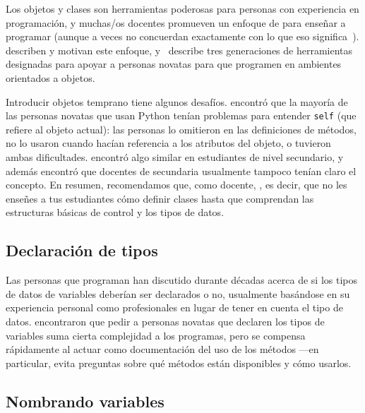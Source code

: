 Los objetos y clases son herramientas poderosas para personas con experiencia en programación,
y muchas/os docentes promueven un enfoque de  para enseñar a programar
(aunque a veces no concuerdan exactamente con lo que eso significa~\cite{Benn2007b}).
\cite{Sorv2014} describen y motivan este enfoque,
y~\cite{Koll2015} describe tres generaciones de herramientas
designadas para apoyar a personas novatas para que programen en ambientes orientados a objetos.

Introducir objetos temprano tiene algunos desafíos.
\cite{Mill2016b} encontró que la mayoría de las personas novatas que usan Python
tenían problemas para entender \texttt{self}
(que refiere al objeto actual):
las personas lo omitieron en las definiciones de métodos,
no lo usaron cuando hacían referencia a los atributos del objeto,
o tuvieron ambas dificultades.
\cite{Rago2017} encontró algo similar en estudiantes de nivel secundario,
y además encontró que docentes de secundaria usualmente tampoco tenían claro el concepto.
En resumen,
recomendamos que, como docente, ,
es decir, que no les enseñes a tus estudiantes cómo definir clases
hasta que comprendan las estructuras básicas de control y los tipos de datos.

\subsection*{Declaración de tipos}

Las personas que programan han discutido durante décadas acerca de si los tipos de datos de variables deberían ser declarados o no,
usualmente basándose en su experiencia personal como profesionales
en lugar de tener en cuenta el tipo de datos.
\cite{Endr2014,Fisc2015} encontraron que pedir a personas novatas que declaren los tipos de variables suma cierta complejidad a los programas,
pero se compensa rápidamente al actuar como documentación del uso de los métodos ---en particular,
evita preguntas sobre qué métodos están disponibles y cómo usarlos.

\subsection*{Nombrando variables}


